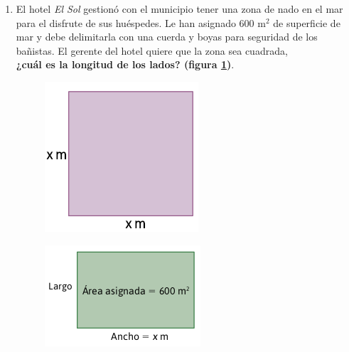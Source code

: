 \documentclass[11pt]{book}
\begin{document}
\begin{enumerate}
    \item El hotel \emph{El Sol} gestionó con el municipio tener una zona de nado en el mar
          para el disfrute de sus huéspedes. Le han asignado 600 m$^2$ de superficie
          de mar y debe delimitarla con una cuerda y boyas para seguridad de los
          bañistas. El gerente del hotel quiere que la zona sea cuadrada, \\
          \textbf{¿cuál es la longitud de los lados? (figura \ref{fig:square})}.

          \begin{minipage}{.45\textwidth}
              \begin{figure}[H]
                  \centering
                  \includegraphics[width=0.4\linewidth]{square.png}
                  \label{fig:square}
              \end{figure}%
          \end{minipage}\hfill
          \begin{minipage}{.45\textwidth}
              \begin{figure}[H]
                  \centering
                  \includegraphics[width=0.6\linewidth]{square2.png}
                  \label{fig:square2}
              \end{figure}
          \end{minipage}


\end{enumerate}
\end{document}
